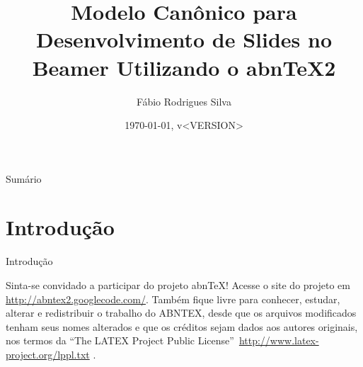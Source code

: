 \documentclass[aspectratio=169]{beamer}
\title{Modelo Canônico para Desenvolvimento de Slides no Beamer Utilizando o abnTeX2}
\author{Fábio Rodrigues Silva}
\institute{Universidade do Brasil
	    \par
	    Faculdade de Arquitetura da Informação}
\date{\today, v<VERSION>}
\begin{document}

\begin{frame}{Sumário}
\tableofcontents
\end{frame}

\section{Introdução}

\begin{frame}{Introdução}

Sinta-se convidado a participar do projeto abnTeX! Acesse o site do projeto em
\url{http://abntex2.googlecode.com/}. Também fique livre para conhecer,
estudar, alterar e redistribuir o trabalho do ABNTEX, desde que os arquivos
modificados tenham seus nomes alterados e que os créditos sejam dados aos
autores originais, nos termos da ``The LATEX Project Public
License''\ \url{http://www.latex-project.org/lppl.txt} \cite[p. 31]{abntex2modelo}.

\end{frame}

\end{document}
